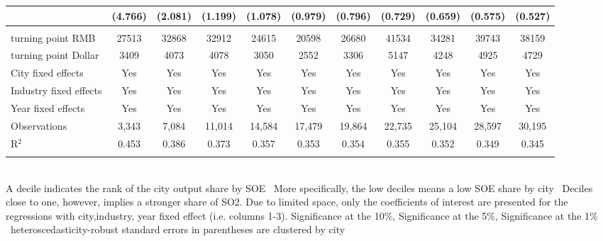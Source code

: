 \documentclass[12pt]{article}
\begin{document}
\begin{table}[!htbp]
\begin{adjustbox}{width=\textwidth, totalheight=\baselineskip,keepaspectratio}
\begin{tabular}{@{\extracolsep{5pt}}lcccccccccc}
  & (4.766) & (2.081) & (1.199) & (1.078) & (0.979) & (0.796) & (0.729) & (0.659) & (0.575) & (0.527) \\ 
 \hline \\[-1.8ex] 
turning point RMB & 27513 & 32868 & 32912 & 24615 & 20598 & 26680 & 41534 & 34281 & 39743 & 38159 \\ 
turning point Dollar & 3409 & 4073 & 4078 & 3050 & 2552 & 3306 & 5147 & 4248 & 4925 & 4729 \\ 
City fixed effects & Yes & Yes & Yes & Yes & Yes & Yes & Yes & Yes & Yes & Yes \\ 
Industry fixed effects & Yes & Yes & Yes & Yes & Yes & Yes & Yes & Yes & Yes & Yes \\ 
Year fixed effects & Yes & Yes & Yes & Yes & Yes & Yes & Yes & Yes & Yes & Yes \\ 
Observations & 3,343 & 7,084 & 11,014 & 14,584 & 17,479 & 19,864 & 22,735 & 25,104 & 28,597 & 30,195 \\ 
R$^{2}$ & 0.453 & 0.386 & 0.373 & 0.357 & 0.353 & 0.354 & 0.355 & 0.352 & 0.349 & 0.345 \\ 
\hline 
\hline \\[-1.8ex] 
\end{tabular}
\end{adjustbox}
\begin{tablenotes} 
 \small 
 \item \\ 
\footnotesize{
A decile indicates the rank of the city output share by SOE \
More specifically, the low deciles means a low SOE share by city \
Deciles close to one, however, implies a stronger share of SO2.
Due to limited space, only the coefficients of interest are presented 
for the regressions with city,industry, year fixed effect (i.e. columns 1-3).
\sym{*} Significance at the 10\%, \sym{**} Significance at the 5\%, \sym{***} Significance at the 1\% \
heteroscedasticity-robust standard errors in parentheses are clustered by city 
}
 
\end{tablenotes}
\end{table}
\end{document}

